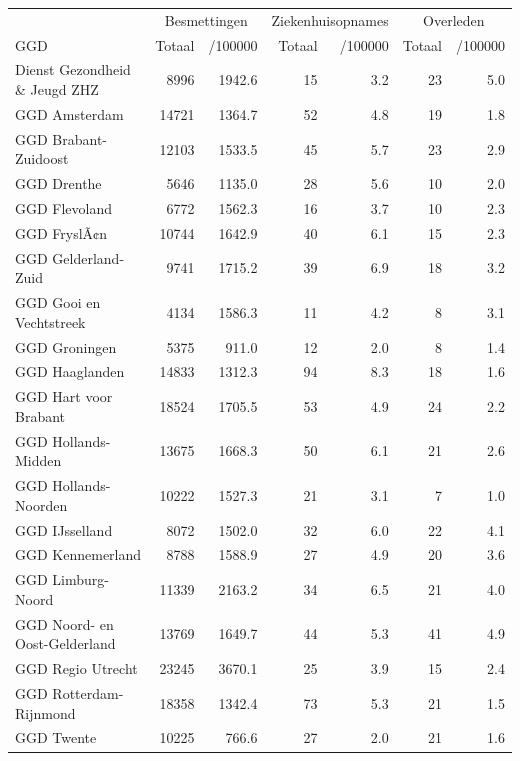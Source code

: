 \documentclass[
  english,
  man,floatsintext]{apa6}
\begin{document}
\begin{table}
\centering\begingroup\fontsize{10}{12}\selectfont

\begin{threeparttable}
\begin{tabular}{lrrrrrr}
\toprule
\multicolumn{1}{c}{ } & \multicolumn{2}{c}{Besmettingen} & \multicolumn{2}{c}{Ziekenhuisopnames} & \multicolumn{2}{c}{Overleden} \\
\cmidrule(l{3pt}r{3pt}){2-3} \cmidrule(l{3pt}r{3pt}){4-5} \cmidrule(l{3pt}r{3pt}){6-7}
GGD & Totaal & /100000 & Totaal & /100000 & Totaal & /100000\\
\midrule
Dienst Gezondheid \& Jeugd ZHZ & 8996 & 1942.6 & 15 & 3.2 & 23 & 5.0\\
GGD Amsterdam & 14721 & 1364.7 & 52 & 4.8 & 19 & 1.8\\
GGD Brabant-Zuidoost & 12103 & 1533.5 & 45 & 5.7 & 23 & 2.9\\
GGD Drenthe & 5646 & 1135.0 & 28 & 5.6 & 10 & 2.0\\
GGD Flevoland & 6772 & 1562.3 & 16 & 3.7 & 10 & 2.3\\
GGD FryslÃ¢n & 10744 & 1642.9 & 40 & 6.1 & 15 & 2.3\\
GGD Gelderland-Zuid & 9741 & 1715.2 & 39 & 6.9 & 18 & 3.2\\
GGD Gooi en Vechtstreek & 4134 & 1586.3 & 11 & 4.2 & 8 & 3.1\\
GGD Groningen & 5375 & 911.0 & 12 & 2.0 & 8 & 1.4\\
GGD Haaglanden & 14833 & 1312.3 & 94 & 8.3 & 18 & 1.6\\
GGD Hart voor Brabant & 18524 & 1705.5 & 53 & 4.9 & 24 & 2.2\\
GGD Hollands-Midden & 13675 & 1668.3 & 50 & 6.1 & 21 & 2.6\\
GGD Hollands-Noorden & 10222 & 1527.3 & 21 & 3.1 & 7 & 1.0\\
GGD IJsselland & 8072 & 1502.0 & 32 & 6.0 & 22 & 4.1\\
GGD Kennemerland & 8788 & 1588.9 & 27 & 4.9 & 20 & 3.6\\
GGD Limburg-Noord & 11339 & 2163.2 & 34 & 6.5 & 21 & 4.0\\
GGD Noord- en Oost-Gelderland & 13769 & 1649.7 & 44 & 5.3 & 41 & 4.9\\
GGD Regio Utrecht & 23245 & 3670.1 & 25 & 3.9 & 15 & 2.4\\
GGD Rotterdam-Rijnmond & 18358 & 1342.4 & 73 & 5.3 & 21 & 1.5\\
GGD Twente & 10225 & 766.6 & 27 & 2.0 & 21 & 1.6\\

\end{tabular}
\end{threeparttable}
\end{table}
\end{document}
